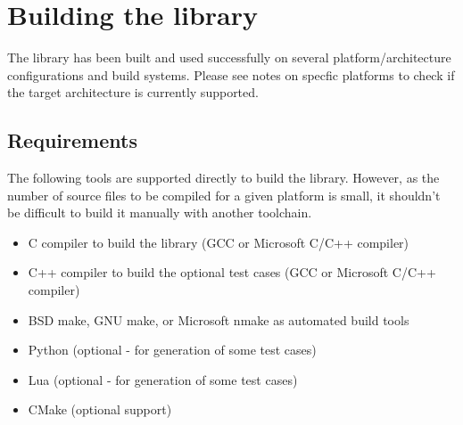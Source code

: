 %
%
%
%

\newpage
\section{Building the library}

The library has been built and used successfully on several 
platform/architecture configurations and build systems.
Please see notes on specfic platforms to check if the target
architecture is currently supported.


\subsection{Requirements}

The following tools are supported directly to build the  library.
However, as the number of source files to be compiled for a given
platform is small, it shouldn't be difficult to build it manually with
another toolchain.
\begin{itemize}
\item C compiler to build the  library (GCC or Microsoft C/C++ compiler)
\item C++ compiler to build the optional test cases (GCC or Microsoft C/C++ compiler)
\item BSD make, GNU make, or Microsoft nmake as automated build tools
\item Python (optional - for generation of some test cases)
\item Lua (optional - for generation of some test cases)
\item CMake (optional support)
\end{itemize}


